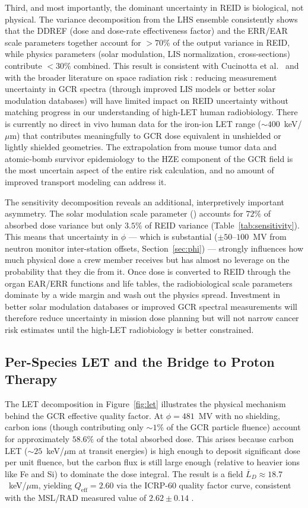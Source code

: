 Third, and most importantly, the dominant uncertainty in REID is biological,
not physical.
The variance decomposition from the LHS ensemble consistently shows that
the DDREF (dose and dose-rate effectiveness factor) and the ERR/EAR scale
parameters together account for $>70\%$ of the output variance in REID,
while physics parameters (solar modulation, LIS normalization,
cross-sections) contribute $<30\%$ combined.
This result is consistent with Cucinotta et al.\ \cite{cucinotta2013} and with the broader
literature on space radiation risk \citep{durante2011}:
reducing measurement uncertainty in GCR spectra (through improved LIS models
or better solar modulation databases) will have limited impact on REID
uncertainty without matching progress in our understanding of
high-LET human radiobiology.
There is currently no direct in vivo human data for the iron-ion LET range
($\sim\!400$~keV/$\mu$m) that contributes meaningfully to GCR dose equivalent
in unshielded or lightly shielded geometries.
The extrapolation from mouse tumor data and atomic-bomb survivor epidemiology
to the HZE component of the GCR field is the most uncertain aspect of the
entire risk calculation, and no amount of improved transport modeling can
address it.

The sensitivity decomposition reveals an additional, interpretively
important asymmetry.
The solar modulation scale parameter () accounts for
$72\%$ of absorbed dose variance but only $3.5\%$ of REID variance
(Table~\ref{tab:sensitivity}).
This means that uncertainty in $\phi$ — which is substantial
($\pm 50$--$100$~MV from neutron monitor inter-station offsets,
Section~\ref{sec:phi}) — strongly influences how much physical dose a
crew member receives but has almost no leverage on the probability that
they die from it.
Once dose is converted to REID through the organ EAR/ERR functions and
life tables, the radiobiological scale parameters dominate by a wide
margin and wash out the physics spread.
Investment in better solar modulation databases or improved GCR spectral
measurements will therefore reduce uncertainty in mission dose planning
but will not narrow cancer risk estimates until the high-LET radiobiology
is better constrained.

\subsection{Per-Species LET and the Bridge to Proton Therapy}
\label{sec:discuss_bridge}

The LET decomposition in Figure~\ref{fig:let} illustrates the physical
mechanism behind the GCR effective quality factor.
At $\phi = 481$~MV with no shielding, carbon ions (though contributing only
$\sim\!1\%$ of the GCR particle fluence) account for approximately $58.6\%$
of the total absorbed dose.
This arises because carbon LET ($\sim\!25$~keV/$\mu$m at transit energies)
is high enough to deposit significant dose per unit fluence, but the carbon
flux is still large enough (relative to heavier ions like Fe and Si) to
dominate the dose integral.
The result is a field $\overline{L}_D \approx 18.7$~keV/$\mu$m, yielding
$Q_\mathrm{eff} = 2.60$ via the ICRP-60 quality factor curve, consistent
with the MSL/RAD measured value of $2.62 \pm 0.14$ \citep{zeitlin2013}.

